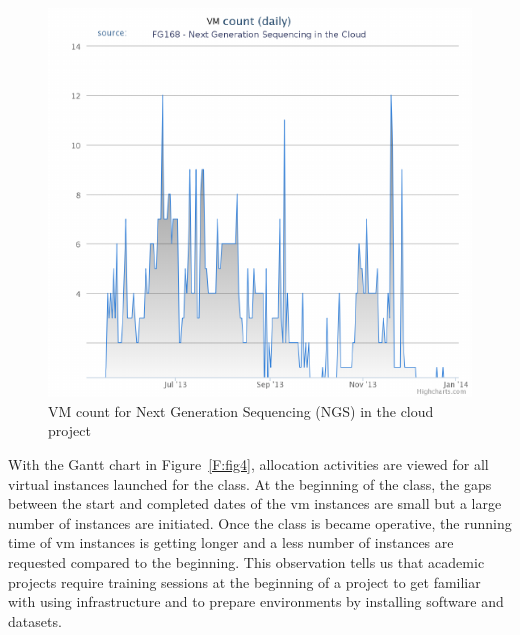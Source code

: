 \documentclass{sig-alternate}
\begin{document}

\begin{figure}[h!] 
  \centering 
    \includegraphics[width=1.0\columnwidth]{images/fig2.pdf} 
  \caption{VM count for Next Generation Sequencing (NGS) in the cloud project}\label{F:fig3} 
\end{figure} 

With the Gantt chart in Figure~\ref{F:fig4}, allocation activities are viewed for all virtual instances launched for the class. At the beginning of the class, the gaps between the start and completed dates of the vm instances are small but a large number of instances are initiated. Once the class is became operative, the running time of vm instances is getting longer and a less number of instances are requested compared to the beginning. This observation tells us that academic projects require training sessions at the beginning of a project to get familiar with using infrastructure and to prepare environments by installing software and datasets.
\end{document}
